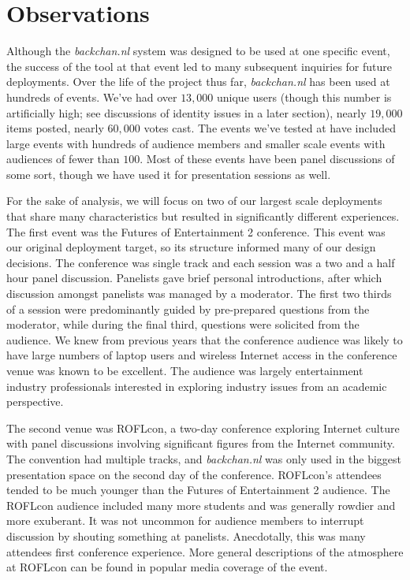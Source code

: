 \section{Observations}
Although the \emph{backchan.nl} system was designed to be used at one specific event, the success of the tool at that event led to many subsequent inquiries for future deployments. Over the life of the project thus far, \emph{backchan.nl} has been used at hundreds of events. We've had over $13,000$ unique users (though this number is artificially high; see discussions of identity issues in a later section), nearly $19,000$ items posted, nearly $60,000$ votes cast. The events we've tested at have included large events with hundreds of audience members and smaller scale events with audiences of fewer than $100$. Most of these events have been panel discussions of some sort, though we have used it for presentation sessions as well.

For the sake of analysis, we will focus on two of our largest scale deployments that share many characteristics but resulted in significantly different experiences. The first event was the Futures of Entertainment 2 conference. This event was our original deployment target, so its structure informed many of our design decisions. The conference was single track and each session was a two and a half hour panel discussion. Panelists gave brief personal introductions, after which discussion amongst panelists was managed by a moderator. The first two thirds of a session were predominantly guided by pre-prepared questions from the moderator, while during the final third, questions were solicited from the audience. We knew from previous years that the conference audience was likely to have large numbers of laptop users and wireless Internet access in the conference venue was known to be excellent. The audience was largely entertainment industry professionals interested in exploring industry issues from an academic perspective.

The second venue was ROFLcon, a two-day conference exploring Internet culture with panel discussions involving significant figures from the Internet community. The convention had multiple tracks, and \emph{backchan.nl} was only used in the biggest presentation space on the second day of the conference. ROFLcon's attendees tended to be much younger than the Futures of Entertainment 2 audience. The ROFLcon audience included many more students and was generally rowdier and more exuberant. It was not uncommon for audience members to interrupt discussion by shouting something at panelists. Anecdotally, this was many attendees first conference experience. More general descriptions of the atmosphere at ROFLcon can be found in popular media coverage of the event. \citep{Raftery:2008vd}

